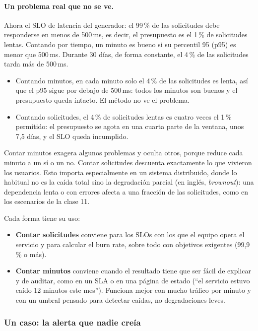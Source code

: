 \documentclass[variant=apuntes,cover=institutional,mode=screen]{ua-engineering-v6-article}
\begin{document}
\paragraph{Un problema real que no se ve.} Ahora el SLO de latencia del generador: el 99\,\% de las solicitudes debe responderse en menos de 500\,ms, es decir, el presupuesto es el 1\,\% de solicitudes lentas. Contando por tiempo, un minuto es bueno si su percentil 95 (p95) es menor que 500\,ms. Durante 30 días, de forma constante, el 4\,\% de las solicitudes tarda más de 500\,ms.
\begin{itemize}
\item Contando minutos, en cada minuto solo el 4\,\% de las solicitudes es lenta, así que el p95 sigue por debajo de 500\,ms: todos los minutos son buenos y el presupuesto queda intacto. El método no ve el problema.
\item Contando solicitudes, el 4\,\% de solicitudes lentas es cuatro veces el 1\,\% permitido: el presupuesto se agota en una cuarta parte de la ventana, unos 7,5 días, y el SLO queda incumplido.
\end{itemize}

Contar minutos exagera algunos problemas y oculta otros, porque reduce cada minuto a un sí o un no. Contar solicitudes descuenta exactamente lo que vivieron los usuarios. Esto importa especialmente en un sistema distribuido, donde lo habitual no es la caída total sino la degradación parcial (en inglés, \emph{brownout}): una dependencia lenta o con errores afecta a una fracción de las solicitudes, como en los escenarios de la clase 11.

Cada forma tiene su uso:
\begin{itemize}
\item \textbf{Contar solicitudes} conviene para los SLOs con los que el equipo opera el servicio y para calcular el burn rate, sobre todo con objetivos exigentes (99,9\,\% o más).
\item \textbf{Contar minutos} conviene cuando el resultado tiene que ser fácil de explicar y de auditar, como en un SLA o en una página de estado (``el servicio estuvo caído 12 minutos este mes''). Funciona mejor con mucho tráfico por minuto y con un umbral pensado para detectar caídas, no degradaciones leves.
\end{itemize}

\subsubsection{Un caso: la alerta que nadie creía}
\end{document}
